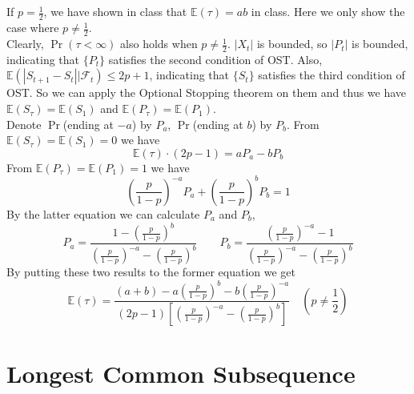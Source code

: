 \documentclass[12pt,letterpaper]{article}
\begin{document}
\subsection{}
If $p=\frac{1}{2}$, we have shown in class that $\mathbb{E}(\tau)=ab$ in class.
Here we only show the case where $p\neq\frac{1}{2}$.\\
Clearly, $\Pr(\tau<\infty)$ also holds when $p\neq\frac{1}{2}$. 
$|X_t|$ is bounded, so $|P_t|$ is bounded,
indicating that $\{P_t\}$ satisfies the second condition of OST.
Also, $\mathbb{E}(|S_{t+1}-S_{t}||\mathcal{F}_t)\leq 2p+1$,
indicating that $\{S_t\}$ satisfies the third condition of OST.
So we can apply the Optional Stopping theorem on them and thus we have
$\mathbb{E}(S_{\tau})=\mathbb{E}(S_{1})$ and $\mathbb{E}(P_{\tau})=\mathbb{E}(P_{1})$.\\
Denote $\Pr$(ending at $-a$) by $P_a$, $\Pr$(ending at $b$) by $P_b$.
From $\mathbb{E}(S_{\tau})=\mathbb{E}(S_{1})=0$ we have 
$$\mathbb{E}(\tau)\cdot(2p-1)=aP_a-bP_b$$
From $\mathbb{E}(P_{\tau})=\mathbb{E}(P_{1})=1$ we have
$$\left(\frac{p}{1-p}\right)^{-a}P_a+\left(\frac{p}{1-p}\right)^{b}P_b=1$$
By the latter equation we can calculate $P_a$ and $P_b$,
$$P_a=\frac{1-\left(\frac{p}{1-p}\right)^b}{\left(\frac{p}{1-p}\right)^{-a}-\left(\frac{p}{1-p}\right)^b}\qquad
P_b=\frac{\left(\frac{p}{1-p}\right)^{-a}-1}{\left(\frac{p}{1-p}\right)^{-a}-\left(\frac{p}{1-p}\right)^b}$$
By putting these two results to the former equation we get
$$\mathbb{E}(\tau)=\frac{(a+b)-a\left(\frac{p}{1-p}\right)^b-b\left(\frac{p}{1-p}\right)^{-a}}
{(2p-1)\left[\left(\frac{p}{1-p}\right)^{-a}-\left(\frac{p}{1-p}\right)^b\right]} \quad (p\neq\frac{1}{2})$$

\section{Longest Common Subsequence}
\end{document}
